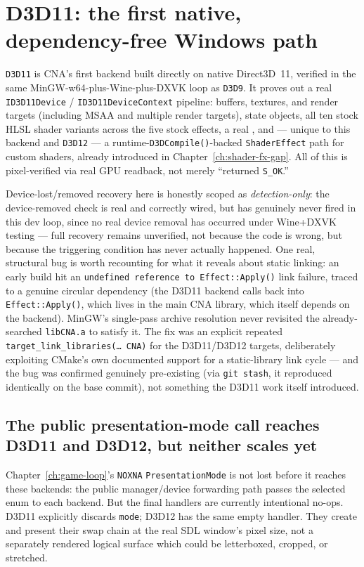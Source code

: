 \section{D3D11: the first native, dependency-free Windows path}

\texttt{D3D11} is CNA's first backend built directly on native Direct3D~11, verified in the
same MinGW-w64-plus-Wine-plus-DXVK loop as \texttt{D3D9}. It proves out a real
\texttt{ID3D11Device} / \texttt{ID3D11DeviceContext} pipeline: buffers, textures, and render
targets (including MSAA and multiple render targets), state objects, all ten stock HLSL
shader variants across the five stock effects, a real , and --- unique
to this backend and \texttt{D3D12} --- a runtime-\texttt{D3DCompile()}-backed
\texttt{ShaderEffect} path for custom shaders, already introduced in
Chapter~\ref{ch:shader-fx-gap}. All of this is pixel-verified via real GPU readback, not
merely ``returned \texttt{S\_OK}.''

Device-lost/removed recovery here is honestly scoped as \emph{detection-only}: the
device-removed check is real and correctly wired, but has genuinely never fired in this dev
loop, since no real device removal has occurred under Wine+DXVK testing --- full recovery
remains unverified, not because the code is wrong, but because the triggering condition has
never actually happened. One real, structural bug is worth recounting for what it reveals
about static linking: an early build hit an \texttt{undefined reference to Effect::Apply()}
link failure, traced to a genuine circular dependency (the D3D11 
backend calls back into \texttt{Effect::Apply()}, which lives in the main CNA library, which
itself depends on the backend). MinGW's single-pass archive resolution never revisited the
already-searched \texttt{libCNA.a} to satisfy it. The fix was an explicit repeated
\texttt{target\_link\_libraries(\ldots{} CNA)} for the D3D11/D3D12 targets, deliberately
exploiting CMake's own documented support for a static-library link cycle --- and the bug was
confirmed genuinely pre-existing (via \texttt{git stash}, it reproduced identically on the
base commit), not something the D3D11 work itself introduced.

\subsection{The public presentation-mode call reaches D3D11 and D3D12, but neither scales yet}

Chapter~\ref{ch:game-loop}'s \texttt{NOXNA} \texttt{Presentation\allowbreak{}Mode} is not lost before it
reaches these backends: the public manager/device forwarding path passes the selected enum to each
backend. But the final handlers are
currently intentional no-ops. D3D11 explicitly discards \texttt{mode}; D3D12 has the same
empty handler. They create and present their swap chain at the real SDL window's pixel size,
not a separately rendered logical surface which could be letterboxed, cropped, or stretched.

